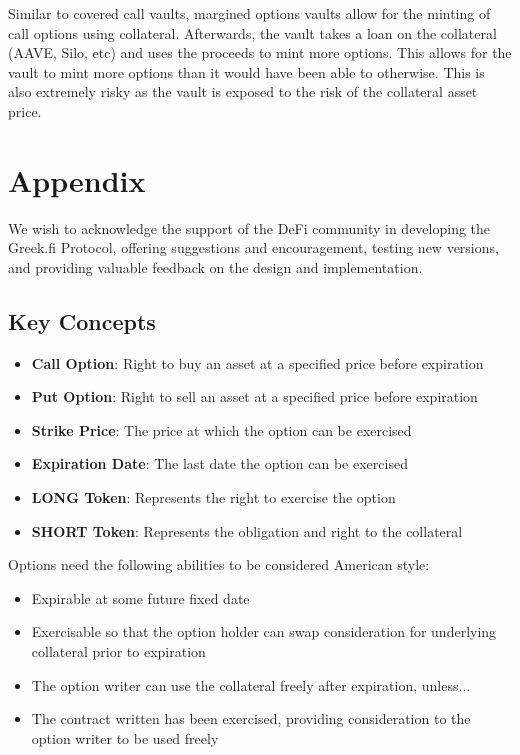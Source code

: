 Similar to covered call vaults, margined options vaults allow for the
minting of call options using collateral. Afterwards, the vault takes a
loan on the collateral (AAVE, Silo, etc) and uses the proceeds to mint
more options. This allows for the vault to mint more options than it
would have been able to otherwise. This is also extremely risky as the 
vault is exposed to the risk of the collateral asset price.

\section{\label{sec:appendix}Appendix}


\begin{acknowledgments}
We wish to acknowledge the support of the DeFi community in developing
the Greek.fi Protocol, offering suggestions and encouragement, testing new versions,
and providing valuable feedback on the design and implementation.
\end{acknowledgments}

\appendix

\subsection{Key Concepts}

\begin{itemize}
\item
  \textbf{Call Option}: Right to buy an asset at a specified price
  before expiration
\item
  \textbf{Put Option}: Right to sell an asset at a specified price
  before expiration
\item
  \textbf{Strike Price}: The price at which the option can be exercised
\item
  \textbf{Expiration Date}: The last date the option can be exercised
\item
  \textbf{LONG Token}: Represents the right to exercise the option
\item
  \textbf{SHORT Token}: Represents the obligation and right to the
  collateral
\end{itemize}

Options need the following abilities to be considered American style:
\begin{itemize}
  \setlength{\itemsep}{0pt}
  \setlength{\parskip}{0pt}
  \item Expirable at some future fixed date
  \item Exercisable so that the option holder can swap consideration for underlying collateral prior to expiration
  \item The option writer can use the collateral freely after expiration, unless...
  \item The contract written has been exercised, providing consideration to the option writer to be used freely
\end{itemize}

